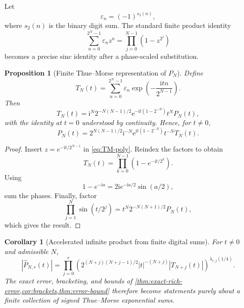 \documentclass[11pt]{article}
\newtheorem{proposition}[theorem]{Proposition}
\newtheorem{corollary}[theorem]{Corollary}
\theoremstyle{definition}
\theoremstyle{remark}
\newcommand{\e}{\mathrm{e}}
\newcommand{\ii}{\mathrm{i}}
\begin{document}
Let
\begin{equation}
\varepsilon_n=(-1)^{s_2(n)},
\label{eq:epsilon}
\end{equation}
where $s_2(n)$ is the binary digit sum. The standard finite product identity
\begin{equation}
\sum_{n=0}^{2^N-1}\varepsilon_n z^n
=\prod_{j=0}^{N-1}(1-z^{2^j})
\label{eq:TM-poly}
\end{equation}
becomes a precise sinc identity after a phase-scaled substitution.

\begin{proposition}[Finite Thue--Morse representation of $P_N$]
\label{prop:TM-PN}
Define
\begin{equation}
T_N(t)=\sum_{n=0}^{2^N-1}\varepsilon_n
\exp\!\left(-\frac{\ii tn}{2^{N-1}}\right).
\label{eq:TN}
\end{equation}
Then
\begin{equation}
T_N(t)=\ii^N2^{-N(N-1)/2}
\e^{-\ii t(1-2^{-N})}t^N P_N(t),
\label{eq:TN-PN}
\end{equation}
with the identity at $t=0$ understood by continuity. Hence, for $t\ne0$,
\begin{equation}
P_N(t)=2^{N(N-1)/2}\ii^{-N}
\e^{\ii t(1-2^{-N})}t^{-N}T_N(t).
\label{eq:PN-TN}
\end{equation}
\end{proposition}

\begin{proof}
Insert $z=e^{-\ii t/2^{N-1}}$ in \cref{eq:TM-poly}. Reindex the factors to obtain
\[
T_N(t)=\prod_{k=0}^{N-1}(1-e^{-\ii t/2^k}).
\]
Using
\[
1-e^{-\ii a}=2\ii e^{-\ii a/2}\sin(a/2),
\]
sum the phases.  Finally, factor
\[
\prod_{j=1}^{N}\sin(t/2^j)
=t^N2^{-N(N+1)/2}P_N(t),
\]
which gives the result.
\end{proof}

\begin{corollary}[Accelerated infinite product from finite digital sums]
\label{cor:TM-accelerated}
For $t\ne0$ and admissible $N$,
\begin{equation}
|\widehat P_{N,r}(t)|
=\prod_{j=0}^{r}
\left(
2^{(N+j)(N+j-1)/2}|t|^{-(N+j)}|T_{N+j}(t)|
\right)^{\lambda_{r,j}(1/4)}.
\label{eq:TM-accelerated}
\end{equation}
The exact error, bracketing, and bounds of \cref{thm:exact-rich-error,cor:brackets,thm:error-bound} therefore become statements purely about a finite collection of signed Thue--Morse exponential sums.
\end{corollary}
\end{document}
